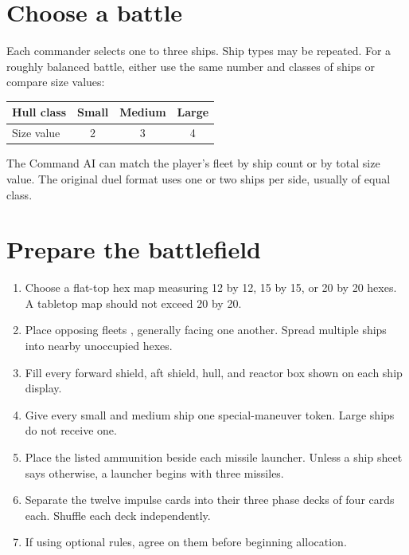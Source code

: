 \section{Choose a battle}

Each commander selects one to three ships. Ship types may be repeated. For a roughly balanced battle, either use the same number and classes of ships or compare size values:

\begin{center}
\begin{tabular}{lccc}\toprule
Hull class & Small & Medium & Large\\\midrule
Size value & 2 & 3 & 4\\\bottomrule
\end{tabular}
\end{center}

The Command AI can match the player's fleet by ship count or by total size value. The original duel format uses one or two ships per side, usually of equal class.

\section{Prepare the battlefield}

\begin{enumerate}
  \item Choose a flat-top hex map measuring 12 by 12, 15 by 15, or 20 by 20 hexes. A tabletop map should not exceed 20 by 20.
  \item Place opposing fleets , generally facing one another. Spread multiple ships into nearby unoccupied hexes.
  \item Fill every forward shield, aft shield, hull, and reactor box shown on each ship display.
  \item Give every small and medium ship one special-maneuver token. Large ships do not receive one.
  \item Place the listed ammunition beside each missile launcher. Unless a ship sheet says otherwise, a launcher begins with three missiles.
  \item Separate the twelve impulse cards into their three phase decks of four cards each. Shuffle each deck independently.
  \item If using optional rules, agree on them before beginning allocation.
\end{enumerate}

